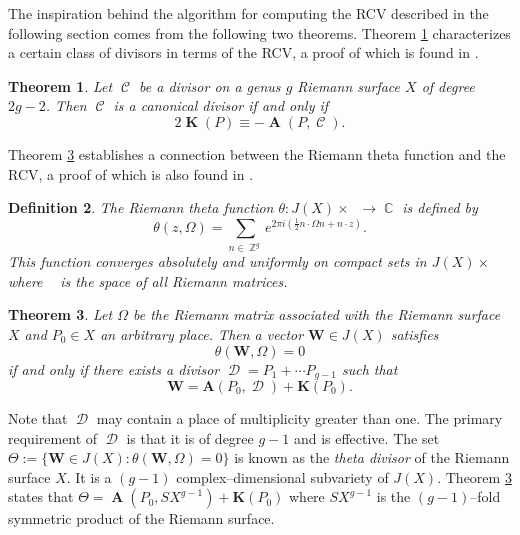 \documentclass[12pt]{article}
\newtheorem{theorem}{Theorem}
\newtheorem{definition}[theorem]{Definition}
\theoremstyle{definition}
\DeclareMathOperator{\ZZ}{\mathbb{Z}}
\DeclareMathOperator{\CC}{\mathbb{C}}
\DeclareMathOperator{\hg}{\mathfrak{h}_g}
\DeclareMathOperator{\DivC}{\mathcal{C}}
\DeclareMathOperator{\DivD}{\mathcal{D}}
\DeclareMathOperator{\RCV}{\boldsymbol{K}}
\DeclareMathOperator{\Abel}{\boldsymbol{A}}
\begin{document}
The inspiration behind the algorithm for computing the RCV described in
the following section comes from the following two theorems. Theorem
\ref{thm:rcvequiv} characterizes a certain class of divisors in terms of
the RCV, a proof of which is found in \cite{FarkasKra92}.
\begin{theorem} \label{thm:rcvequiv}
  Let $\DivC$ be a divisor on a genus $g$ Riemann surface $X$ of degree
  $2g - 2$. Then $\DivC$ is a canonical divisor if and only if
  \begin{equation} \label{eqn:rcvequiv}
    2\RCV(P) \equiv -\Abel(P,\DivC).
  \end{equation}
\end{theorem}
\noindent Theorem \ref{thm:thetadivisor} establishes a connection
between the Riemann theta function and the RCV, a proof of which is also
found in \cite{FarkasKra92}.
\begin{definition} \label{def:riemanntheta}
  The Riemann theta function $\theta: J(X) \times \hg \to \CC$ is
  defined by
  \begin{equation} \label{eqn:riemanntheta}
    \theta(z,\Omega)
    =
    \sum_{n \in \ZZ^g}
    e^{2 \pi i \left( \tfrac{1}{2} n \cdot \Omega n + n \cdot z \right)}.
  \end{equation}
  This function converges absolutely and uniformly on compact sets in
  $J(X) \times \hg$ where $\hg$ is the space of all Riemann matrices.
\end{definition}

\begin{theorem} \label{thm:thetadivisor}
  Let $\Omega$ be the Riemann matrix associated with the Riemann surface
  $X$ and $P_0 \in X$ an arbitrary place. Then a vector $\boldsymbol{W}
  \in J(X)$ satisfies
  \begin{equation} \label{eqn:thetadivisor1}
    \theta(\boldsymbol{W}, \Omega) = 0
  \end{equation}
  if and only if there exists a divisor $\DivD = P_1 + \cdots P_{g-1}$
  such that
  \begin{equation} \label{eqn:thetadivisor2}
    \boldsymbol{W} = \boldsymbol{A}(P_0, \DivD) + \boldsymbol{K}(P_0).
  \end{equation}
\end{theorem}
Note that $\DivD$ may contain a place of multiplicity greater than
one. The primary requirement of $\DivD$ is that it is of degree $g-1$
and is effective. The set $\Theta := \{ \boldsymbol{W} \in J(X) :
\theta(\boldsymbol{W},\Omega) = 0\}$ is known as the {\it theta divisor}
of the Riemann surface $X$. It is a $(g-1)$ complex--dimensional
subvariety of $J(X)$. Theorem \ref{thm:thetadivisor} states that $\Theta
= \Abel\left(P_0,SX^{g-1}\right) + \boldsymbol{K}(P_0)$ where $SX^{g-1}$
is the $(g-1)$--fold symmetric product of the Riemann surface.
\end{document}

